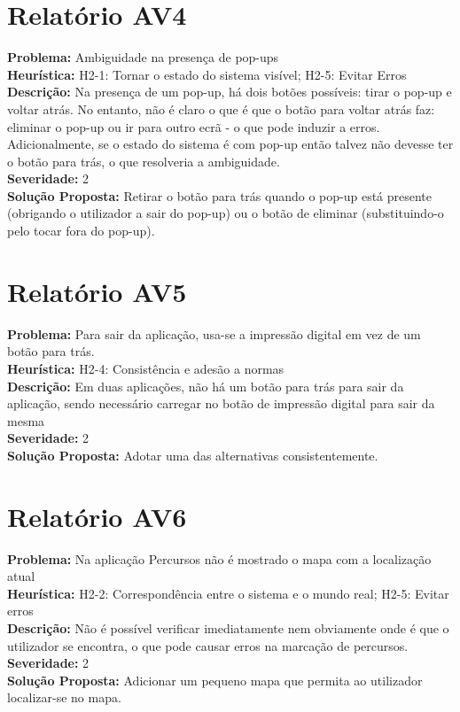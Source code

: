 \documentclass[a4paper]{article}
\begin{document}
\begin{multicols}{2}
\section*{Relatório AV4}
\textbf{Problema:} Ambiguidade na presença de pop-ups\\
\textbf{Heurística:} H2-1: Tornar o estado do sistema visível; H2-5: Evitar Erros\\
\textbf{Descrição:} Na presença de um pop-up, há dois botões possíveis: tirar o pop-up e voltar atrás. No entanto, não é claro o que é que o botão para voltar atrás faz: eliminar o pop-up ou ir para outro ecrã - o que pode induzir a erros. Adicionalmente, se o estado do sistema é com pop-up então talvez não devesse ter o botão para trás, o que resolveria a ambiguidade.\\
\textbf{Severidade:} 2\\
\textbf{Solução Proposta:} Retirar o botão para trás quando o pop-up está
  presente (obrigando o utilizador a sair do pop-up) ou o botão de eliminar
  (substituindo-o pelo tocar fora do pop-up).

\section*{Relatório AV5}
\textbf{Problema:} Para sair da aplicação, usa-se a impressão digital em vez de um botão para trás.\\
\textbf{Heurística:} H2-4: Consistência e adesão a normas\\
\textbf{Descrição:} Em duas aplicações, não há um botão para trás para sair da aplicação, sendo necessário carregar no botão de impressão digital para sair da mesma\\
\textbf{Severidade:} 2\\
\textbf{Solução Proposta:} Adotar uma das alternativas consistentemente.

\section*{Relatório AV6}
\textbf{Problema:} Na aplicação Percursos não é mostrado o mapa com a localização atual\\
\textbf{Heurística:} H2-2: Correspondência entre o sistema e o mundo real; H2-5: Evitar erros\\
\textbf{Descrição:} Não é possível verificar imediatamente nem obviamente onde é
  que o utilizador se encontra, o que pode causar erros na marcação de percursos.\\
\textbf{Severidade:} 2\\
\textbf{Solução Proposta:} Adicionar um pequeno mapa que permita ao utilizador
  localizar-se no mapa.


\end{multicols}
\end{document}
